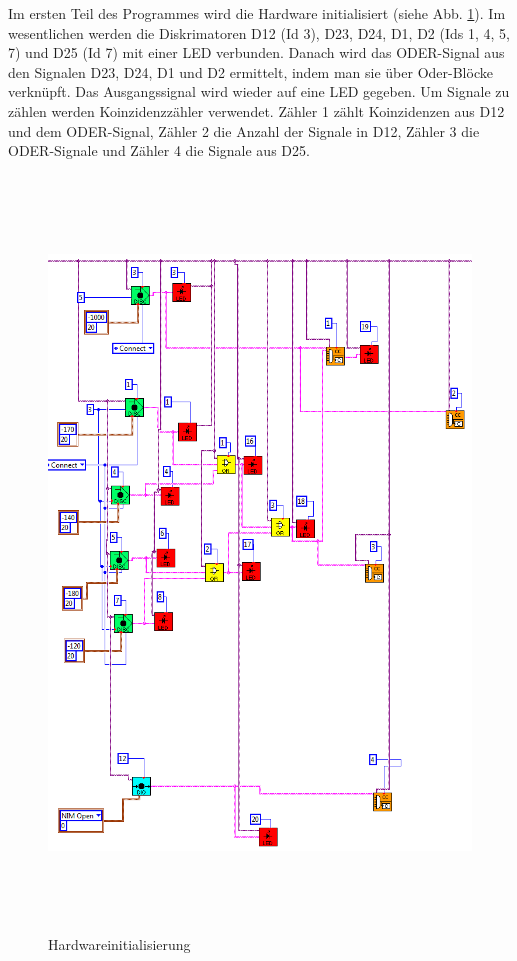 Im ersten Teil des Programmes wird die Hardware initialisiert (siehe Abb. \ref{fig:prog_init}). Im wesentlichen werden die Diskrimatoren D12 (Id 3), D23, D24, D1, D2 (Ids 1, 4, 5, 7) und D25 (Id 7) mit einer LED verbunden. Danach wird das ODER-Signal aus den Signalen D23, D24, D1 und D2 ermittelt, indem man sie über Oder-Blöcke verknüpft. Das Ausgangssignal wird wieder auf eine LED gegeben. Um Signale zu zählen werden Koinzidenzzähler verwendet. Zähler 1 zählt Koinzidenzen aus D12 und dem ODER-Signal, Zähler 2 die Anzahl der Signale in D12, Zähler 3 die ODER-Signale und Zähler 4 die Signale aus D25. \\
 
\begin{figure}
\centering
\includegraphics[height=20cm]{data/friedrich/prog_init.png}
\caption{Hardwareinitialisierung}
\label{fig:prog_init}
\end{figure}

